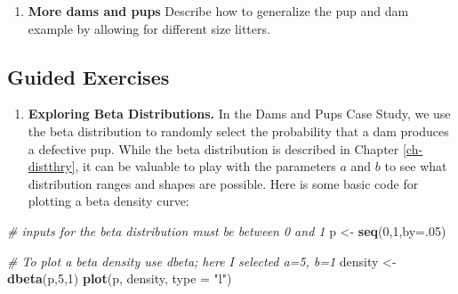\documentclass[
]{krantz}
\newenvironment{Shaded}{\begin{snugshade}}{\end{snugshade}}
\newcommand{\CommentTok}[1]{\textcolor[rgb]{0.37,0.37,0.37}{\textit{#1}}}
\newcommand{\DataTypeTok}[1]{\textcolor[rgb]{0.27,0.27,0.27}{#1}}
\newcommand{\DecValTok}[1]{\textcolor[rgb]{0.06,0.06,0.06}{#1}}
\newcommand{\KeywordTok}[1]{\textcolor[rgb]{0.27,0.27,0.27}{\textbf{#1}}}
\newcommand{\NormalTok}[1]{#1}
\newcommand{\StringTok}[1]{\textcolor[rgb]{0.5,0.5,0.5}{#1}}
\providecommand{\tightlist}{%
  \setlength{\itemsep}{0pt}\setlength{\parskip}{0pt}}
\begin{document}
\begin{enumerate}
\def\labelenumi{\arabic{enumi}.}
\setcounter{enumi}{1}
\tightlist
\item
  \textbf{More dams and pups} Describe how to generalize the pup and dam example by allowing for different size litters.
\end{enumerate}

\hypertarget{guided-exercises-4}{%
\subsection{Guided Exercises}\label{guided-exercises-4}}

\begin{enumerate}
\def\labelenumi{\arabic{enumi}.}
\tightlist
\item
  \textbf{Exploring Beta Distributions.} In the Dams and Pups Case Study, we use the beta distribution to randomly select the probability that a dam produces a defective pup. While the beta distribution is described in Chapter \ref{ch-distthry}, it can be valuable to play with the parameters \(a\) and \(b\) to see what distribution ranges and shapes are possible. Here is some basic code for plotting a beta density curve:
\end{enumerate}

\begin{Shaded}
\begin{Highlighting}[]
\CommentTok{# inputs for the beta distribution must be between 0 and 1}
\NormalTok{p <-}\StringTok{ }\KeywordTok{seq}\NormalTok{(}\DecValTok{0}\NormalTok{,}\DecValTok{1}\NormalTok{,}\DataTypeTok{by=}\NormalTok{.}\DecValTok{05}\NormalTok{)  }

\CommentTok{# To plot a beta density use dbeta; here I selected a=5, b=1}
\NormalTok{density <-}\StringTok{ }\KeywordTok{dbeta}\NormalTok{(p,}\DecValTok{5}\NormalTok{,}\DecValTok{1}\NormalTok{)}
\KeywordTok{plot}\NormalTok{(p, density, }\DataTypeTok{type =} \StringTok{"l"}\NormalTok{)}
\end{Highlighting}
\end{Shaded}
\end{document}
